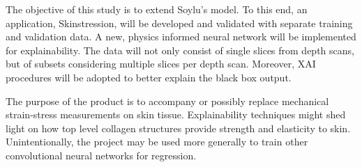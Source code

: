 The objective of this study is to extend Soylu's model.
To this end, an application, Skinstression, will be developed and validated with separate training and validation data.
A new, physics informed neural network will be implemented for explainability.
The data will not only consist of single slices from depth scans, but of subsets considering multiple slices per depth scan.
Moreover, XAI procedures will be adopted to better explain the black box output.

The purpose of the product is to accompany or possibly replace mechanical strain-stress measurements on skin tissue.
Explainability techniques might shed light on how top level collagen structures provide strength and elasticity to skin.
Unintentionally, the project may be used more generally to train other convolutional neural networks for regression.
